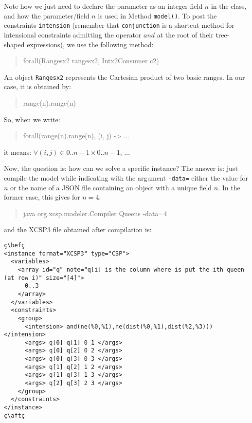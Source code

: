 \documentclass[10pt]{article}
\def\xt{{\rm XCSP3}\xspace}
\newcommand{\gb}[1]{{\tt #1}} %
\newcommand{\nn}[1]{{\tt #1}} %
\def\xt{{\rm XCSP3}\xspace}
\newenvironment{myvb}{\endgraf\small\verbatim}{\endverbatim}
\def\bef{\rule{10cm}{0.1mm}} %
\def\aft{\rule{10cm}{0.1mm}\medskip}
\begin{document}
Note how we just need to declare the parameter as an integer field $n$ in the class, and how the parameter/field $n$ is used in Method \nn{model()}.
To post the constraints \gb{intension} (remember that \gb{conjunction} is a shortcut method for intensional constraints admitting the operator $and$ at the root of their tree-shaped expressions), we use the following method:

\begin{quote}
\begin{myvb}
forall(Rangesx2 rangesx2, Intx2Consumer c2) 
\end{myvb}
\end{quote}

An object \nn{Rangesx2} represents the Cartesian product of two basic ranges. In our case, it is obtained by:
\begin{quote}
\begin{myvb}
range(n).range(n)
\end{myvb}
\end{quote}
So, when we write:
\begin{quote}
\begin{myvb}
forall(range(n).range(n), (i, j) -> ...
\end{myvb}
\end{quote}
it means: $\forall (i,j) \in 0..n-1 \times 0..n-1$, $\dots$

\bigskip
Now, the question is: how can we solve a specific instance?
The answer is: just compile the model while indicating with the argument \verb!-data=! either the value for $n$ or the name of a JSON file containing an object with a unique field $n$.
In the former case, this gives for $n=4$: 
\begin{quote}
\begin{myvb}
java org.xcsp.modeler.Compiler Queens -data=4
\end{myvb}
\end{quote}
and the \xt file obtained after compilation is:
\begin{lstlisting}
ç\befç
<instance format="XCSP3" type="CSP">
  <variables>
    <array id="q" note="q[i] is the column where is put the ith queen (at row i)" size="[4]">
      0..3
    </array>
  </variables>
  <constraints>
    <group>
      <intension> and(ne(%0,%1),ne(dist(%0,%1),dist(%2,%3))) </intension>
      <args> q[0] q[1] 0 1 </args>
      <args> q[0] q[2] 0 2 </args>
      <args> q[0] q[3] 0 3 </args>
      <args> q[1] q[2] 1 2 </args>
      <args> q[1] q[3] 1 3 </args>
      <args> q[2] q[3] 2 3 </args>
    </group>
  </constraints>
</instance>
ç\aftç
\end{lstlisting}
\end{document}
